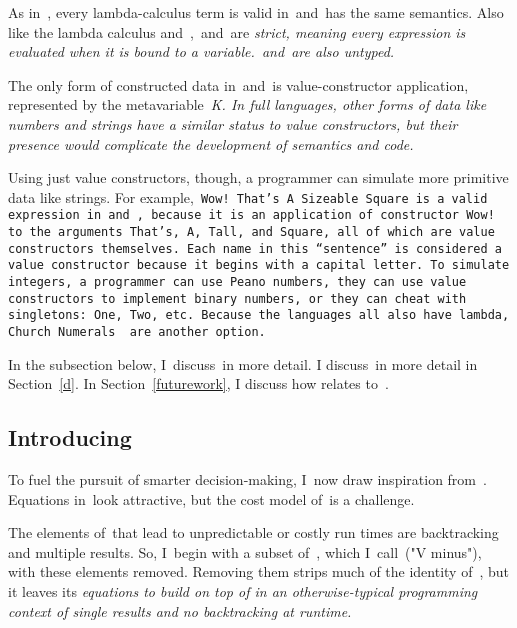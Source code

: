\documentclass[manuscript,screen 12pt, nonacm]{acmart}
\begin{document}
    As in~\VC, every lambda-calculus term is valid in~\VMinus and~\D has the
    same semantics. Also like the lambda calculus and~\VC,~\VMinus and~\D are
    \it{strict}, meaning every expression is evaluated when it is bound to a
    variable.~\VMinus and~\D are also untyped. 
    
    The only form of constructed data in~\VMinus and~\D is value-constructor
    application, represented by the metavariable~\it{K}. In full languages,
    other forms of data like numbers and strings have a similar status to value
    constructors, but their presence would complicate the development of
    semantics and code. 
    
    Using just value constructors, though, a programmer can simulate more
    primitive data like strings. For example,~\tt{Wow! That's A Sizeable Square} is
    a valid expression in~\VMinus and~\D, because it is an application of
    constructor~\tt{Wow!} to the arguments~\tt{That's},~\tt{A},~\tt{Tall}, and
    \tt{Square}, all of which are value constructors themselves. Each name in
    this “sentence” is considered a value constructor because it begins with a
    capital letter. To simulate integers, a programmer can use Peano numbers,
    they can use value constructors to implement binary numbers, or they can
    cheat with singletons:~\tt{One},~\tt{Two}, etc. Because the languages all
    also have lambda, Church Numerals~\citep{church1985calculi} are another
    option. 

    In the subsection below, I~discuss~\VMinus in more detail. I discuss~\D in
    more detail in Section~\ref{d}. In Section~\ref{futurework}, I discuss how
    \VMinus relates to~\VC. 

\subsection{Introducing~\VMinus}
\label{vminus}

        To fuel the pursuit of smarter decision-making, I~now draw inspiration
        from~\VC. Equations in~\VC look attractive, but the cost model of~\VC is
        a challenge. 
        
        The elements of~\VC that lead to unpredictable or costly run times are
        backtracking and multiple results. So, I~begin with a subset of~\VC,
        which I~call~\VMinus ("V minus"), with these elements removed. Removing
        them strips much of the identity of~\VC, but it leaves its
        \it{equations} to build on top of in an otherwise-typical programming
        context of single results and no backtracking at runtime. 
\end{document}
